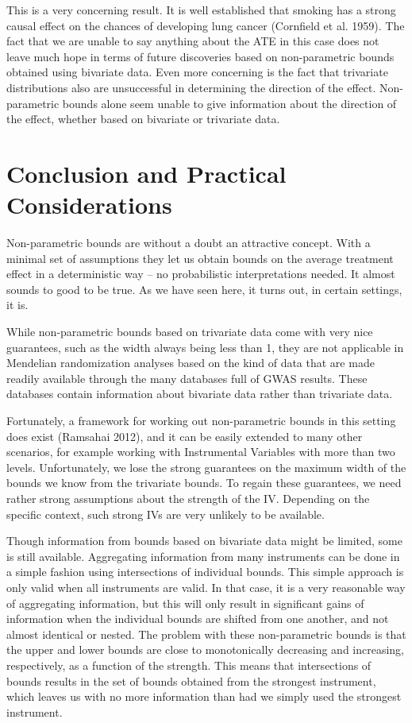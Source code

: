 \documentclass[
]{article}
\theoremstyle{plain}
\begin{document}
This is a very concerning result. It is well established that smoking has a strong causal effect on the chances of developing lung cancer (Cornfield et al. 1959). The fact that we are unable to say anything about the ATE in this case does not leave much hope in terms of future discoveries based on non-parametric bounds obtained using bivariate data. Even more concerning is the fact that trivariate distributions also are unsuccessful in determining the direction of the effect. Non-parametric bounds alone seem unable to give information about the direction of the effect, whether based on bivariate or trivariate data.

\newpage

\hypertarget{conclusion-and-practical-considerations}{%
\section{Conclusion and Practical Considerations}\label{conclusion-and-practical-considerations}}

Non-parametric bounds are without a doubt an attractive concept. With a minimal set of assumptions they let us obtain bounds on the average treatment effect in a deterministic way -- no probabilistic interpretations needed. It almost sounds to good to be true. As we have seen here, it turns out, in certain settings, it is.

While non-parametric bounds based on trivariate data come with very nice guarantees, such as the width always being less than 1, they are not applicable in Mendelian randomization analyses based on the kind of data that are made readily available through the many databases full of GWAS results. These databases contain information about bivariate data rather than trivariate data.

Fortunately, a framework for working out non-parametric bounds in this setting does exist (Ramsahai 2012), and it can be easily extended to many other scenarios, for example working with Instrumental Variables with more than two levels. Unfortunately, we lose the strong guarantees on the maximum width of the bounds we know from the trivariate bounds. To regain these guarantees, we need rather strong assumptions about the strength of the IV. Depending on the specific context, such strong IVs are very unlikely to be available.

Though information from bounds based on bivariate data might be limited, some is still available. Aggregating information from many instruments can be done in a simple fashion using intersections of individual bounds. This simple approach is only valid when all instruments are valid. In that case, it is a very reasonable way of aggregating information, but this will only result in significant gains of information when the individual bounds are shifted from one another, and not almost identical or nested. The problem with these non-parametric bounds is that the upper and lower bounds are close to monotonically decreasing and increasing, respectively, as a function of the strength. This means that intersections of bounds results in the set of bounds obtained from the strongest instrument, which leaves us with no more information than had we simply used the strongest instrument.
\end{document}
